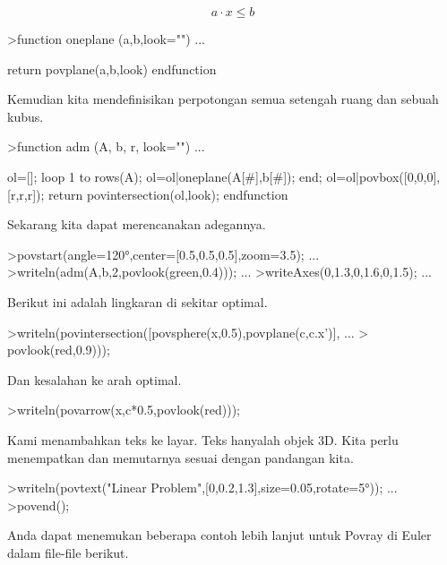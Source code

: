 \documentclass{article}
\begin{document}
\begin{eulernotebook}
\begin{eulercomment}
\begin{eulercomment}
\begin{eulercomment}
\begin{eulercomment}
\begin{eulercomment}
\end{eulercomment}
\begin{eulerformula}
\[
a \cdot x \le b
\]
\end{eulerformula}
\begin{eulerprompt}
>function oneplane (a,b,look="") ...
\end{eulerprompt}
\begin{eulerudf}
    return povplane(a,b,look)
  endfunction
\end{eulerudf}
\begin{eulercomment}
Kemudian kita mendefinisikan perpotongan semua setengah ruang dan
sebuah kubus.
\end{eulercomment}
\begin{eulerprompt}
>function adm (A, b, r, look="") ...
\end{eulerprompt}
\begin{eulerudf}
    ol=[];
    loop 1 to rows(A); ol=ol|oneplane(A[#],b[#]); end;
    ol=ol|povbox([0,0,0],[r,r,r]);
    return povintersection(ol,look);
  endfunction
\end{eulerudf}
\begin{eulercomment}
Sekarang kita dapat merencanakan adegannya.
\end{eulercomment}
\begin{eulerprompt}
>povstart(angle=120°,center=[0.5,0.5,0.5],zoom=3.5); ...
>writeln(adm(A,b,2,povlook(green,0.4))); ...
>writeAxes(0,1.3,0,1.6,0,1.5); ...
\end{eulerprompt}
\begin{eulercomment}
Berikut ini adalah lingkaran di sekitar optimal.
\end{eulercomment}
\begin{eulerprompt}
>writeln(povintersection([povsphere(x,0.5),povplane(c,c.x')], ...
>  povlook(red,0.9)));
\end{eulerprompt}
\begin{eulercomment}
Dan kesalahan ke arah optimal.
\end{eulercomment}
\begin{eulerprompt}
>writeln(povarrow(x,c*0.5,povlook(red)));
\end{eulerprompt}
\begin{eulercomment}
Kami menambahkan teks ke layar. Teks hanyalah objek 3D. Kita perlu
menempatkan dan memutarnya sesuai dengan pandangan kita.
\end{eulercomment}
\begin{eulerprompt}
>writeln(povtext("Linear Problem",[0,0.2,1.3],size=0.05,rotate=5°)); ...
>povend();
\end{eulerprompt}
\begin{eulercomment}
Anda dapat menemukan beberapa contoh lebih lanjut untuk Povray di
Euler dalam file-file berikut.


\end{eulercomment}
\end{eulercomment}
\end{eulercomment}
\end{eulercomment}
\end{eulercomment}
\end{eulernotebook}
\end{document}
